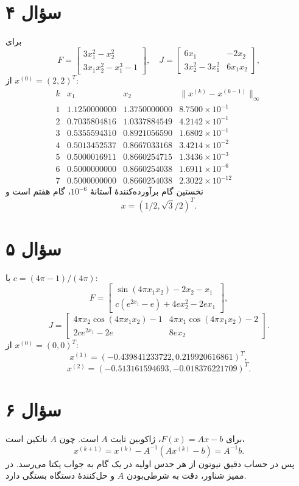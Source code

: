 \documentclass[12pt]{article}
\begin{document}
\section*{سؤال ۴}
برای
\[
 F=\begin{bmatrix}3x_1^2-x_2^2\\3x_1x_2^2-x_1^3-1\end{bmatrix},
 \quad
 J=\begin{bmatrix}6x_1&-2x_2\\3x_2^2-3x_1^2&6x_1x_2\end{bmatrix},
\]
از \(x^{(0)}=(2,2)^T\):
\[
\begin{array}{c|rr|c}
k&x_1&x_2&\|x^{(k)}-x^{(k-1)}\|_\infty\\ \hline
1&1.1250000000&1.3750000000&8.7500\times10^{-1}\\
2&0.7035804816&1.0337884549&4.2142\times10^{-1}\\
3&0.5355594310&0.8921056590&1.6802\times10^{-1}\\
4&0.5013452537&0.8667033168&3.4214\times10^{-2}\\
5&0.5000016911&0.8660254715&1.3436\times10^{-3}\\
6&0.5000000000&0.8660254038&1.6911\times10^{-6}\\
7&0.5000000000&0.8660254038&2.3022\times10^{-12}
\end{array}
\]
نخستین گام برآورده‌کنندهٔ آستانهٔ \(10^{-6}\)، گام هفتم است و
\[
 \boxed{x=(1/2,\sqrt3/2)^T}.
\]

\clearpage
\section*{سؤال ۵}
با \(c=(4\pi-1)/(4\pi)\):
\[
 F=\begin{bmatrix}\sin(4\pi x_1x_2)-2x_2-x_1\\
 c(e^{2x_1}-e)+4ex_2^2-2ex_1\end{bmatrix},
\]
\[
 J=\begin{bmatrix}
4\pi x_2\cos(4\pi x_1x_2)-1&4\pi x_1\cos(4\pi x_1x_2)-2\\
2ce^{2x_1}-2e&8ex_2
\end{bmatrix}.
\]
از \(x^{(0)}=(0,0)^T\):
\[
 \boxed{x^{(1)}=(-0.439841233722,0.219920616861)^T},
\]
\[
 \boxed{x^{(2)}=(-0.513161594693,-0.018376221709)^T}.
\]

\section*{سؤال ۶}
برای \(F(x)=Ax-b\)، ژاکوبین ثابت \(A\) است. چون \(A\) ناتکین است،
\[
 x^{(k+1)}=x^{(k)}-A^{-1}(Ax^{(k)}-b)=A^{-1}b.
\]
پس در حساب دقیق نیوتون از هر حدس اولیه در یک گام به جواب یکتا می‌رسد. در ممیز شناور، دقت به شرطی‌بودن \(A\) و حل‌کنندهٔ دستگاه بستگی دارد.
\end{document}
